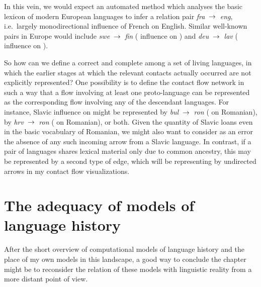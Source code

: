 In this vein, we would expect an automated method which analyses the basic lexicon of modern European languages to infer a relation pair \textit{fra} $\kern 2pt\hbox{$\rightarrow$}\kern 2pt$ \textit{eng}, i.e.\ largely monodirectional influence of French on English. Similar well-known pairs in Europe would include \textit{swe} $\kern 2pt\hbox{$\rightarrow$}\kern 2pt$ \textit{fin} ( influence on ) and \textit{deu} $\kern 2pt\hbox{$\rightarrow$}\kern 2pt$ \textit{lav} ( influence on ).

So how can we define a correct and complete  among a set of living languages, in which the earlier stages at which the relevant contacts actually occurred are not explicitly represented? One possibility is to define the contact flow network in such a way that a flow involving at least one proto-language can be represented as the corresponding flow involving any of the descendant languages. For instance, Slavic influence on  might be represented by \textit{bul} $\kern 2pt\hbox{$\rightarrow$}\kern 2pt$ \textit{ron} ( on Romanian), by \textit{hrv} $\kern 2pt\hbox{$\rightarrow$}\kern 2pt$ \textit{ron} ( on Romanian), or both. Given the quantity of Slavic loans even in the basic vocabulary of Romanian, we might also want to consider as an error the absence of any such incoming arrow from a Slavic language. In contrast, if a pair of languages shares lexical material only due to common ancestry, this may be represented by a second type of edge, which will be representing by 
undirected arrows in my contact flow visualizations.

\section{The adequacy of models of language history}\label{sec:2:7}
After the short overview of computational models of language history and the place of my own models in this landscape, a good way to conclude the chapter might be to reconsider the relation of these models with linguistic reality from a more distant point of view. 


